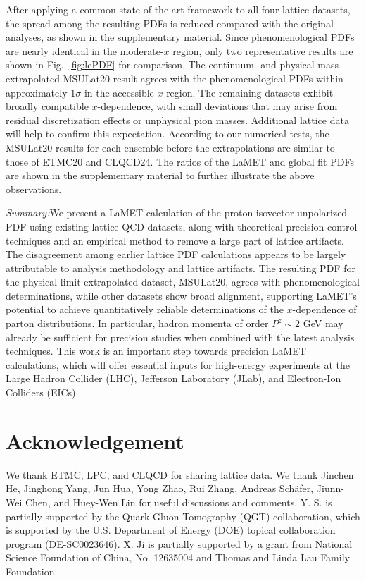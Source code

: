 \documentclass[prl,aps,twocolumn,preprintnumbers, showpacs, nofootinbib,superscriptaddress,notitlepage]{revtex4-1}
\begin{document}
After applying a common state-of-the-art framework to all four lattice datasets, the spread among the resulting PDFs is reduced compared with the original analyses, as shown in the supplementary material. Since phenomenological PDFs~\cite{ATLAS:2021vod,NNPDF:2021njg,Bailey:2020ooq,Hou:2019efy,Alekhin:2017kpj,H1:2015ubc,Jimenez-Delgado:2014twa} are nearly identical in the moderate-$x$ region, only two representative results are shown in Fig.~\ref{fig:lcPDF} for comparison. The continuum- and physical-mass-extrapolated MSULat20 result agrees with the phenomenological PDFs within approximately $1\sigma$ in the accessible $x$-region. The remaining datasets exhibit broadly compatible $x$-dependence, with small deviations that may arise from residual discretization effects or unphysical pion masses.
Additional lattice data will help to confirm this
expectation. According to our numerical tests, the MSULat20 results for each ensemble before the extrapolations are similar to those of ETMC20 and CLQCD24. The ratios of the LaMET and global fit PDFs are shown in the supplementary material to further illustrate the above observations. 

\textit{Summary:}\quad We present a LaMET calculation of the proton isovector unpolarized PDF using existing lattice QCD datasets, along with theoretical precision-control techniques and an empirical method to remove a large part of
lattice artifacts. The disagreement among earlier lattice PDF calculations appears to be largely attributable to analysis methodology and lattice artifacts. The resulting PDF for the physical-limit-extrapolated dataset, MSULat20, agrees with phenomenological determinations, while other datasets show broad alignment, supporting LaMET's potential to achieve quantitatively reliable determinations of the $x$-dependence of parton distributions. In particular, hadron momenta of order $P^z\sim 2$ GeV may already be sufficient for precision studies when combined with the latest analysis techniques. This work is an important step towards precision LaMET calculations, which will offer essential inputs for high-energy experiments at the Large Hadron Collider (LHC), Jefferson Laboratory (JLab), and Electron-Ion Colliders (EICs).  



\section*{Acknowledgement}
We thank ETMC, LPC, and CLQCD for sharing lattice data. We thank Jinchen He, Jinghong Yang, Jun Hua, Yong Zhao, Rui Zhang, Andreas Schäfer, Jiunn-Wei Chen, and Huey-Wen Lin for useful discussions and comments. Y. S. is partially supported by the Quark-Gluon Tomography (QGT) collaboration, which is supported by the U.S. Department of Energy (DOE) topical collaboration program (DE-SC0023646). X. Ji is partially supported by a grant from National Science Foundation of China, No. 12635004 and Thomas and Linda Lau Family Foundation.  



\clearpage


\end{document}
